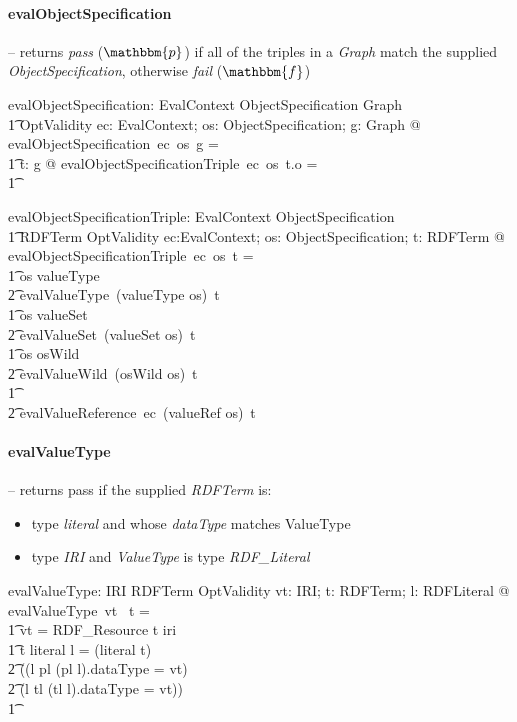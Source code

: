 \documentclass[fuzz]{llncs}
\def\entryFor{\cdot}
\def\pass{{\mathbbm{p}}}
\def\fail{{\mathbbm{f}}}
\def\zc{\textit}
\begin{document}
\paragraph{evalObjectSpecification} -- returns \zc{pass} ($\pass$) if all of the triples in a \zc{Graph} 
match the supplied \zc{ObjectSpecification}, otherwise \zc{fail} ($\fail$)
\begin{gendef}
   evalObjectSpecification: EvalContext \fun ObjectSpecification \fun Graph \fun \\
\t1 OptValidity
\where
   \forall ec: EvalContext; os: ObjectSpecification; g: Graph @ \\ evalObjectSpecification~ec~os~g = \\
\t1 \IF \forall t: g @ evalObjectSpecificationTriple~ec~os~t.o = \pass \THEN \pass \\
\t1 \ELSE \fail
\end{gendef}
\begin{gendef}
   evalObjectSpecificationTriple: EvalContext \fun ObjectSpecification \fun \\
\t1 RDFTerm \fun OptValidity
\where
   \forall ec:EvalContext; os: ObjectSpecification; t: RDFTerm @ \\
  evalObjectSpecificationTriple~ec~os~t = \\
\t1 \IF os \in \ran valueType \THEN \\
\t2 evalValueType~(valueType \entryFor os)~t \\
\t1 \ELSE \IF os \in \ran valueSet \THEN \\
\t2 evalValueSet~(valueSet \entryFor os)~t \\
\t1 \ELSE \IF os \in \ran osWild \THEN \\
\t2 evalValueWild~(osWild \entryFor os)~t \\
\t1 \ELSE \\
\t2 evalValueReference~ec~(valueRef \entryFor os)~t
\end{gendef}


\paragraph{evalValueType} -- returns pass if the supplied \zc{RDFTerm} is:
\begin{itemize}
\item type \zc{literal} and whose \zc{dataType} matches ValueType
\item type \zc{IRI} and \zc{ValueType} is type \zc{RDF\_Literal}
\end{itemize}
\begin{gendef}
   evalValueType: IRI \pfun RDFTerm \pfun OptValidity
\where
   \forall vt: IRI; t: RDFTerm; l: RDFLiteral @ evalValueType~vt~ t = \\
\t1 \IF vt = RDF\_Resource \land  t \in \ran iri \THEN \pass \\
\t1 \ELSE \IF t \in \ran literal \land l = (literal \entryFor t) \land \\
\t2 ((l \in \ran pl \land (pl \entryFor l).dataType = vt) \lor \\
\t2  (l \in \ran tl \land (tl \entryFor l).dataType = vt)) \THEN \pass \\
\t1 \ELSE \fail
\end{gendef}
\end{document}

